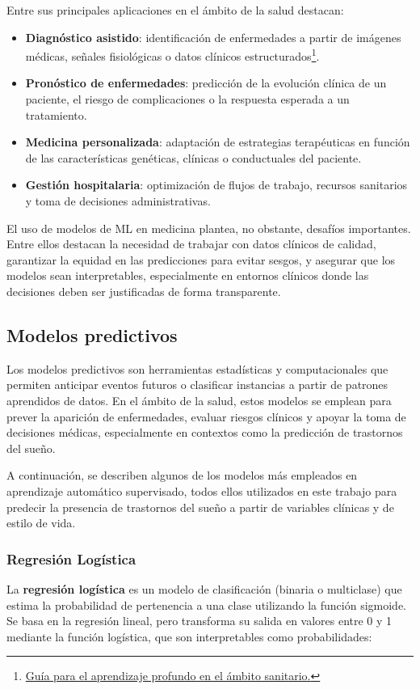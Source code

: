 Entre sus principales aplicaciones en el ámbito de la salud destacan:

\begin{itemize}
    \item \textbf{Diagnóstico asistido}: identificación de enfermedades a partir de imágenes médicas, señales fisiológicas o datos clínicos estructurados\footnote{\href{https://doi.org/10.1038/s41591-018-0337-2}{Guía para el aprendizaje profundo en el ámbito sanitario.}}.
    \item \textbf{Pronóstico de enfermedades}: predicción de la evolución clínica de un paciente, el riesgo de complicaciones o la respuesta esperada a un tratamiento.
    \item \textbf{Medicina personalizada}: adaptación de estrategias terapéuticas en función de las características genéticas, clínicas o conductuales del paciente.
    \item \textbf{Gestión hospitalaria}: optimización de flujos de trabajo, recursos sanitarios y toma de decisiones administrativas.
\end{itemize}

El uso de modelos de ML en medicina plantea, no obstante, desafíos importantes. Entre ellos destacan la necesidad de trabajar con datos clínicos de calidad, garantizar la equidad en las predicciones para evitar sesgos, y asegurar que los modelos sean interpretables, especialmente en entornos clínicos donde las decisiones deben ser justificadas de forma transparente.


\subsection{Modelos predictivos}
Los modelos predictivos son herramientas estadísticas y computacionales que permiten anticipar eventos futuros o clasificar instancias a partir de patrones aprendidos de datos. En el ámbito de la salud, estos modelos se emplean para prever la aparición de enfermedades, evaluar riesgos clínicos y apoyar la toma de decisiones médicas, especialmente en contextos como la predicción de trastornos del sueño.

A continuación, se describen algunos de los modelos más empleados en aprendizaje automático supervisado, todos ellos utilizados en este trabajo para predecir la presencia de trastornos del sueño a partir de variables clínicas y de estilo de vida.


\subsubsection{Regresión Logística}
La \textbf{regresión logística} es un modelo de clasificación (binaria o multiclase) que estima la probabilidad de pertenencia a una clase utilizando la función sigmoide. Se basa en la regresión lineal, pero transforma su salida en valores entre 0 y 1 mediante la función logística, que son interpretables como probabilidades:



